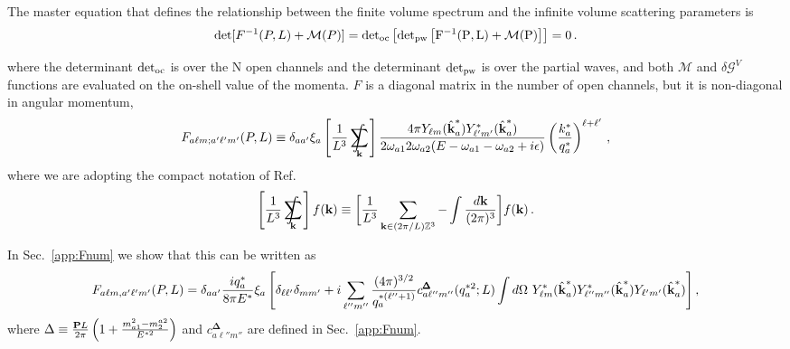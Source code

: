 
The master equation that defines the relationship between the finite volume spectrum and the infinite volume scattering parameters is \cite{Luscher:1986pf, Rummukainen:1995vs, Kim:2005gf, Briceno:2012yi, Hansen:2012tf, Briceno:2014oea}
\begin{align}
\det[F^{-1}(P,L) + \mathcal M(P)]=
{\rm{det}}_{\rm{oc}}\left[\rm{det}_{\rm{pw}}\left[F^{-1}(P,L) + \mathcal M(P)\right]\right]=0 \,.
\label{eq:QC}
\end{align}

where the determinant $\rm{det}_{\rm{oc}}$ is over the N open channels and the determinant $\rm{det}_{\rm{pw}}$ is over the partial waves, and both $\mathcal{M}$ and $\delta \mathcal{G}^V$ functions are evaluated on the on-shell value of the momenta. $F$ is a diagonal matrix in the number of open channels, but it is non-diagonal in angular momentum, 
\begin{equation}
\label{eq:Fscdef}
F_{a \ell m ; a' \ell' m'}(P,L)  \equiv \delta_{aa'}\xi_a 
\left[\frac{1}{L^3}\sum_{\mathbf{k}}\hspace{-.5cm}\int~\right]
\frac{ 4 \pi  Y_{\ell m }(\hat {\textbf k}^*_a)Y^*_{\ell' m'}(\hat {\textbf k}^*_a)  }{2 \omega_{a1} 2 \omega_{a2}(E -  \omega_{a1} - \omega_{a2} + i \epsilon )} \left (\frac{k^{*}_a}{q^*_a} \right)^{\ell+\ell'} \,,
\end{equation}
where we are adopting the compact notation of Ref.~\cite{Briceno:2015tza}
\begin{equation}
 \left[ \frac{1}{L^3}\sum_{\mathbf{k}}\hspace{-.5cm}\int~\right]f(\textbf{k})\equiv\bigg [ \frac{1}{L^3} \sum_{\textbf k \in (2 \pi/L) \mathbb Z^3} - \int \frac{d\textbf k}{(2 \pi)^3} \bigg ] f(\textbf{k})\,.
\end{equation}


In Sec.~\ref{app:Fnum} we show that this can be written as 
\begin{equation}
F_{a \ell m,a' \ell' m'}(P,L)= \delta_{aa'}\frac{iq^*_a}{8\pi E^*}\xi_a \left[\delta_{\ell\ell'}\delta_{m m'} +i\sum_{\ell'' m''}\frac{(4\pi)^{3/2}}{q_a^{*({\ell''}+1)}}c_{a \ell'' m''}^{{\pmb \Delta}}(q_a^{*2};{L})  \int d\Omega~Y^*_{ \ell m}(\hat {\textbf k}^*_a) Y^*_{\ell'' m''}(\hat {\textbf k}^*_a) Y_{\ell' m'}(\hat {\textbf k}^*_a) \right],
\label{eq:Ffunct_KSS}
\end{equation}
where $\Delta \equiv \frac{\textbf P L}{2 \pi} \left (1 + \frac{m_{a1}^2 - m^{a2}_2}{E^{*2}} \right)$ and $c_{a \ell'' m''}^{{\pmb \Delta}}$ are defined in Sec.~\ref{app:Fnum}.

